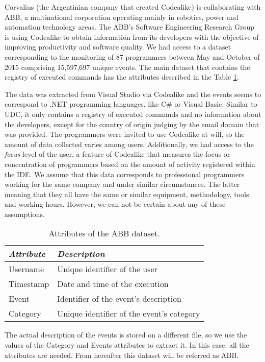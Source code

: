 Corvalius (the Argentinian company that created Codealike) is collaborating with ABB, a multinational corporation operating mainly in robotics, power and automation technology areas. The ABB's Software Engineering Research Group is using Codealike to obtain information from its developers with the objective of improving productivity and software quality. We had access to a dataset corresponding to the monitoring of 87 programmers between May and October of 2015 comprising 15,597,697 unique events. The main dataset that contains the registry of executed commands has the attributes described in the Table \ref{tbl:att_abb}.

The data was extracted from Visual Studio via Codealike and the events seems to correspond to .NET programming languages, like C\# or Visual Basic. Similar to UDC, it only contains a registry of executed commands and no information about the developers, except for the country of origin judging by the email domain that was provided. The programmers were invited to use Codealike at will, so the amount of data collected varies among users. Additionally, we had access to the \emph{focus} level of the user, a feature of Codealike that measures the focus or concentration of programmers based on the amount of activity registered within the IDE. We assume that this data corresponds to professional programmers working for the same company and under similar circumstances. The latter meaning that they all have the same or similar equipment, methodology, tools and working hours. However, we can not be certain about any of these assumptions.

\begin{table}[ht!]
	\small
	\caption{Attributes of the ABB dataset. }
	\label{tbl:att_abb}
	\centering
	\begin{tabular}{p{2.5cm}|p{7cm}} 
		\hline 
		\emph{Attribute} & \emph{Description} \\  
		\hline 
		\hline 
		Username &  Unique identifier of the user \\
		\hline
		Timestamp & Date and time of the execution  \\
		\hline
		Event & Identifier of the event's description  \\
		\hline
		Category & Unique identifier of the event's category \\
		\hline
	\end{tabular}
	
\end{table}

The actual description of the events is stored on a different file, so we use the values of the Category and Events attributes to extract it. In this case, all the attributes are needed. From hereafter this dataset will be referred as ABB.

